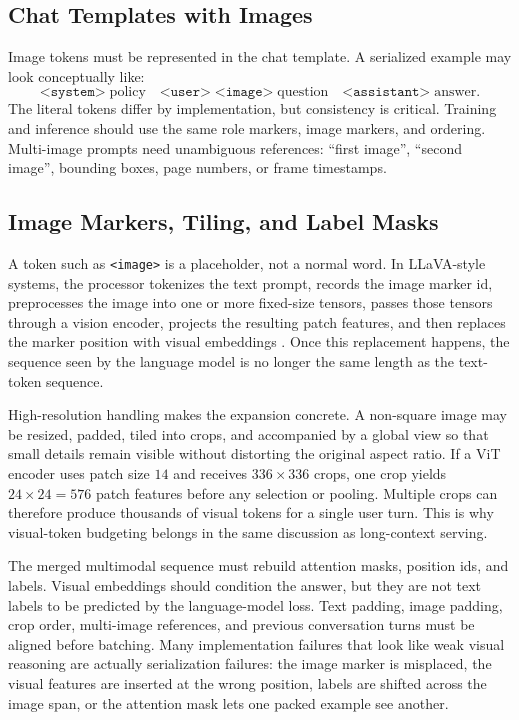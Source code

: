 \subsection{Chat Templates with Images}
Image tokens must be represented in the chat template. A serialized example may look conceptually like:
\[
    \texttt{<system>} \; \text{policy}
    \quad
    \texttt{<user>} \; \texttt{<image>} \; \text{question}
    \quad
    \texttt{<assistant>} \; \text{answer}.
\]
The literal tokens differ by implementation, but consistency is critical. Training and inference should use the same role markers, image markers, and ordering. Multi-image prompts need unambiguous references: ``first image'', ``second image'', bounding boxes, page numbers, or frame timestamps.

\subsection{Image Markers, Tiling, and Label Masks}
A token such as \texttt{<image>} is a placeholder, not a normal word. In LLaVA-style systems, the processor tokenizes the text prompt, records the image marker id, preprocesses the image into one or more fixed-size tensors, passes those tensors through a vision encoder, projects the resulting patch features, and then replaces the marker position with visual embeddings \cite{liu2023visual}. Once this replacement happens, the sequence seen by the language model is no longer the same length as the text-token sequence.

High-resolution handling makes the expansion concrete. A non-square image may be resized, padded, tiled into crops, and accompanied by a global view so that small details remain visible without distorting the original aspect ratio. If a ViT encoder uses patch size $14$ and receives $336\times336$ crops, one crop yields $24\times24=576$ patch features before any selection or pooling. Multiple crops can therefore produce thousands of visual tokens for a single user turn. This is why visual-token budgeting belongs in the same discussion as long-context serving.

The merged multimodal sequence must rebuild attention masks, position ids, and labels. Visual embeddings should condition the answer, but they are not text labels to be predicted by the language-model loss. Text padding, image padding, crop order, multi-image references, and previous conversation turns must be aligned before batching. Many implementation failures that look like weak visual reasoning are actually serialization failures: the image marker is misplaced, the visual features are inserted at the wrong position, labels are shifted across the image span, or the attention mask lets one packed example see another.

